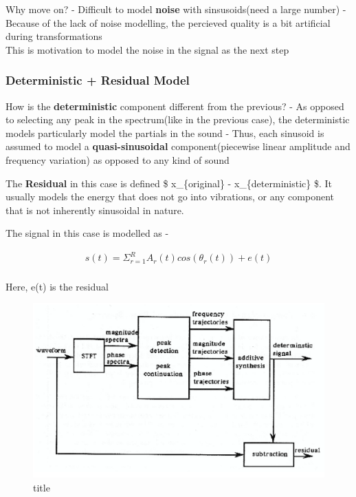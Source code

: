 \documentclass[11pt]{article}
\makeatletter
\def\maxwidth{\ifdim\Gin@nat@width>\linewidth\linewidth
    \else\Gin@nat@width\fi}
\let\Oldincludegraphics\includegraphics
\renewcommand{\includegraphics}[1]{\Oldincludegraphics[width=.8\maxwidth]{#1}}
\makeatother
\begin{document}
    Why move on? - Difficult to model \textbf{noise} with sinsusoids(need a
large number) - Because of the lack of noise modelling, the percieved
quality is a bit artificial during transformations\\
This is motivation to model the noise in the signal as the next step

    \subsubsection{Deterministic + Residual
Model}\label{deterministic-residual-model}

    How is the \textbf{deterministic} component different from the previous?
- As opposed to selecting any peak in the spectrum(like in the previous
case), the deterministic models particularly model the partials in the
sound - Thus, each sinusoid is assumed to model a
\textbf{quasi-sinusoidal} component(piecewise linear amplitude and
frequency variation) as opposed to any kind of sound

The \textbf{Residual} in this case is defined \$ x\_\{original\} -
x\_\{deterministic\} \$. It usually models the energy that does not go
into vibrations, or any component that is not inherently sinusoidal in
nature.

    The signal in this case is modelled as -

\begin{align}
s(t) = \Sigma_{r=1}^{R} A_{r}(t) cos(\theta_{r}(t)) + e(t)\\
\end{align}

Here, e(t) is the residual

    \begin{figure}
\centering
\includegraphics{fig_5.png}
\caption{title}
\end{figure}
\end{document}
